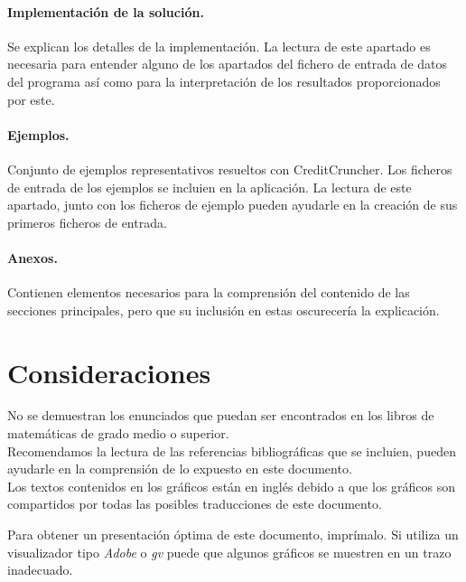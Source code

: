 \paragraph{Implementaci\'on de la soluci\'on.} Se explican los detalles de
la implementaci\'on. La lectura de este apartado es necesaria para entender 
alguno de los apartados del fichero de entrada de datos del programa as\'i como 
para la interpretaci\'on de los resultados proporcionados por este.

\paragraph{Ejemplos.} Conjunto de ejemplos representativos resueltos con
CreditCruncher. Los ficheros de entrada de los ejemplos se incluien en la
aplicaci\'on. La lectura de este apartado, junto con los ficheros de ejemplo 
pueden ayudarle en la creaci\'on de sus primeros ficheros de entrada.

\paragraph{Anexos.} Contienen elementos necesarios para la comprensi\'on del 
contenido de las secciones principales, pero que su inclusi\'on en estas 
oscurecer\'ia la explicaci\'on.

\section{Consideraciones}

No se demuestran los enunciados que puedan ser encontrados en los libros de 
matem\'aticas de grado medio o superior. \\

Recomendamos la lectura de las referencias bibliogr\'aficas que se incluien, 
pueden ayudarle en la comprensi\'on de lo expuesto en este documento.\\

Los textos contenidos en los gr\'aficos est\'an en ingl\'es debido a que los 
gr\'aficos son compartidos por todas las posibles traducciones de este 
documento.

Para obtener un presentaci\'on \'optima de este documento, impr\'imalo. Si 
utiliza un visualizador tipo \emph{Adobe} o \emph{gv} puede que algunos 
gr\'aficos se muestren en un trazo inadecuado.

